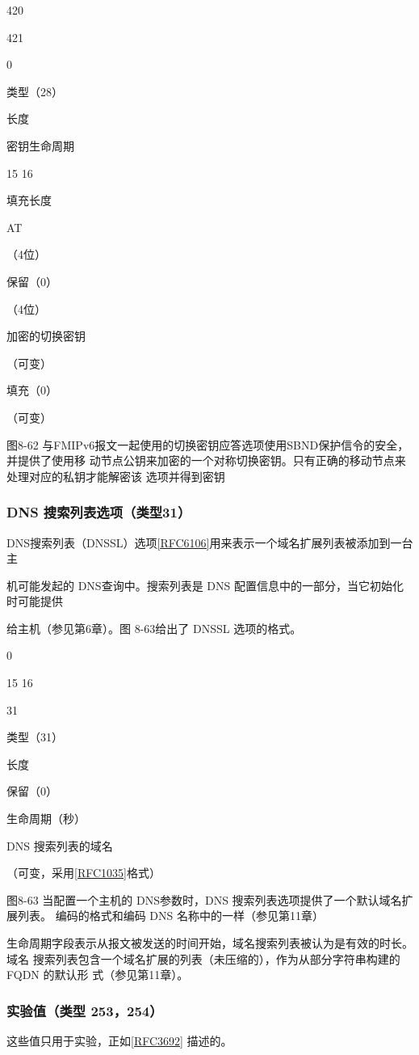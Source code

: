 420

421

0

类型（28）

长度

密钥生命周期

15 16

填充长度

AT

（4位）

保留（0）

（4位）

加密的切换密钥

（可变）

填充（0）

（可变）

图8-62 与FMIPv6报文一起使用的切换密钥应答选项使用SBND保护信令的安全，并提供了使用移
动节点公钥来加密的一个对称切换密钥。只有正确的移动节点来处理对应的私钥才能解密该
选项并得到密钥

\subsubsection{DNS 搜索列表选项（类型31）}
DNS搜索列表（DNSSL）选项\href{https://www.rfc-editor.org/rfc/rfc6106}{[RFC6106]}用来表示一个域名扩展列表被添加到一台主

机可能发起的 DNS查询中。搜索列表是 DNS 配置信息中的一部分，当它初始化时可能提供

给主机（参见第6章）。图 8-63给出了 DNSSL 选项的格式。

0

15 16

31

类型（31）

长度

保留（0）

生命周期（秒）

DNS 搜索列表的域名

（可变，采用\href{https://www.rfc-editor.org/rfc/rfc1035}{[RFC1035]}格式）

图8-63 当配置一个主机的 DNS参数时，DNS 搜索列表选项提供了一个默认域名扩展列表。
编码的格式和编码 DNS 名称中的一样（参见第11章）

生命周期字段表示从报文被发送的时间开始，域名搜索列表被认为是有效的时长。域名
搜索列表包含一个域名扩展的列表（未压缩的），作为从部分字符串构建的FQDN 的默认形
式（参见第11章）。

\subsubsection{实验值（类型 253，254）}
这些值只用于实验，正如\href{https://www.rfc-editor.org/rfc/rfc3692}{[RFC3692]} 描述的。


